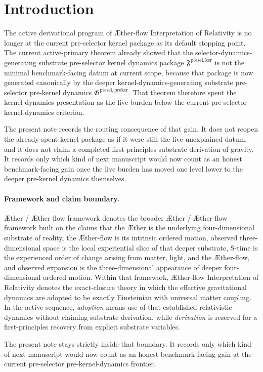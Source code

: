\documentclass[11pt]{article}
\newcommand{\Aether}{\AE{}ther}
\newcommand{\Aflow}{\AE{}ther-flow}
\newcommand{\TheoryName}{\Aflow{} Interpretation of Relativity}
\newcommand{\TheoryProgram}{\Aether{} / \Aflow{} framework}
\newcommand{\PreKernelPackage}{\mathfrak G^{\mathrm{presel,preker}}}
\newcommand{\KernelPackage}{\mathfrak F^{\mathrm{presel,ker}}}
\begin{document}
\section{Introduction}

The active derivational program of \TheoryName{} is no longer at the current pre-selector kernel package as its default stopping point. The current active-primary theorem already showed that the selector-dynamics-generating substrate pre-selector kernel dynamics package \(\KernelPackage\) is not the minimal benchmark-facing datum at current scope, because that package is now generated canonically by the deeper kernel-dynamics-generating substrate pre-selector pre-kernel dynamics \(\PreKernelPackage\). That theorem therefore spent the kernel-dynamics presentation as the live burden below the current pre-selector kernel-dynamics criterion.

The present note records the routing consequence of that gain. It does not reopen the already-spent kernel package as if it were still the live unexplained datum, and it does not claim a completed first-principles substrate derivation of gravity. It records only which kind of next manuscript would now count as an honest benchmark-facing gain once the live burden has moved one level lower to the deeper pre-kernel dynamics themselves.

\paragraph{Framework and claim boundary.}
\TheoryProgram{} denotes the broader \Aether{} / \Aflow{} framework built on the claims that the \Aether{} is the underlying four-dimensional substrate of reality, the \Aflow{} is its intrinsic ordered motion, observed three-dimensional space is the local experiential slice of that deeper substrate, S-time is the experienced order of change arising from matter, light, and the \Aflow{}, and observed expansion is the three-dimensional appearance of deeper four-dimensional ordered motion. Within that framework, \TheoryName{} denotes the exact-closure theory in which the effective gravitational dynamics are adopted to be exactly Einsteinian with universal matter coupling. In the active sequence, \emph{adoption} means use of that established relativistic dynamics without claiming substrate derivation, while \emph{derivation} is reserved for a first-principles recovery from explicit substrate variables.

The present note stays strictly inside that boundary. It records only which kind of next manuscript would now count as an honest benchmark-facing gain at the current pre-selector pre-kernel-dynamics frontier.
\end{document}
